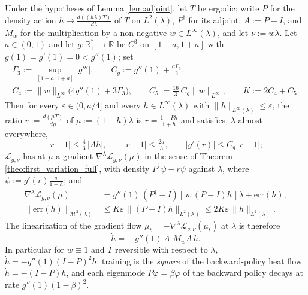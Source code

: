 \begin{theorem}\label{theo:gd_diffusion_full}
Under the hypotheses of Lemma \ref{lem:adjoint}, let $T$ be ergodic; write $P$ for the density action $h\mapsto\frac{d((h\lambda)T)}{d\lambda}$ of $T$ on $L^2(\lambda)$, $P^\dagger$ for its adjoint, $A:=P-I$, and $M_w$ for the multiplication by a non-negative $w\in L^\infty(\lambda)$, and let $\nu:=w\lambda$. Let $a\in(0,1)$ and let $g:\mathbb R_+^*\rightarrow\mathbb R$ be $C^3$ on $[1-a,1+a]$ with $g(1)=g'(1)=0<g''(1)$; set
\begin{gather*}
    \Gamma_3:=\sup_{[1-a,1+a]}|g'''|,\qquad C_g:=g''(1)+\frac{a\Gamma_3}2,\\
    C_4:=\|w\|_{L^\infty}\bigl(4g''(1)+3\Gamma_3\bigr),\qquad C_5:=\frac{16}3\,C_g\|w\|_{L^\infty},\qquad K:=2C_4+C_5.
\end{gather*}
Then for every $\varepsilon\in(0,a/4]$ and every $h\in L^\infty(\lambda)$ with $\|h\|_{L^\infty(\lambda)}\leq\varepsilon$, the ratio $r:=\frac{d(\mu T)}{d\mu}$ of $\mu:=(1+h)\lambda$ is $r=\frac{1+Ph}{1+h}$ and satisfies, $\lambda$-almost everywhere,
\begin{equation}\label{eq:gd_ratio_bounds}
    |r-1|\leq\tfrac43\,|Ah|,\qquad |r-1|\leq\tfrac{2a}3,\qquad |g'(r)|\leq C_g\,|r-1|;
\end{equation}
$\mathcal L_{g,\nu}$ has at $\mu$ a gradient $\nabla^{\lambda}\mathcal L_{g,\nu}(\mu)$ in the sense of Theorem \ref{theo:first_variation_full}, with density $P^\dagger\psi-r\psi$ against $\lambda$, where $\psi:=g'(r)\frac{w}{1+h}$; and
\begin{equation}\label{eq:linearized_flow}
\begin{aligned}
    \nabla^{\lambda}\mathcal L_{g,\nu}(\mu) &= g''(1)\, \left(P^\dagger - I\right)\!\left[\,w\,(P-I)h\,\right]\lambda + \mathrm{err}(h),\\
    \|\mathrm{err}(h)\|_{\mathcal M^2(\lambda)}&\leq K\varepsilon\,\|(P-I)h\|_{L^2(\lambda)}\leq 2K\varepsilon\,\|h\|_{L^2(\lambda)}.
\end{aligned}
\end{equation}
The linearization of the gradient flow $\dot\mu_t = -\nabla^{\lambda}\mathcal L_{g,\nu}(\mu_t)$ at $\lambda$ is therefore
\begin{equation}
    \dot h = -\,g''(1)\, A^\dagger M_w A\, h .
\end{equation}
In particular for $w\equiv1$ and $T$ reversible with respect to $\lambda$,
$\dot h = -g''(1)(I-P)^2 h$: training is the \emph{square} of the backward-policy heat flow $\dot h = -(I-P)h$, and each eigenmode $P\varphi = \beta\varphi$ of the backward policy decays at rate $g''(1)(1-\beta)^2$.
\end{theorem}

